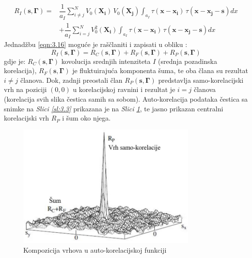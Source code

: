 \begin{equation}
	\begin{split}
		R_{I}(\boldsymbol{s}, \boldsymbol{\Gamma}) = &\dfrac{1}{a_{I}}\sum_{i\neq j}^{N}V_{0}(\boldsymbol{X_{i}})\, V_{0}(\boldsymbol{X_{j}})\int_{a_{I}}\tau (\boldsymbol{x}-\boldsymbol{x_{i}})\, \tau (\boldsymbol{x}-\boldsymbol{x_{j}}-\boldsymbol{s})dx\\
		 &+ \dfrac{1}{a_{I}}\sum_{i=j}^{N}V_{0}^{2}(\boldsymbol{X_{i}})\int_{a_{I}}\tau (\boldsymbol{x}-\boldsymbol{x_{i}})\, \tau (\boldsymbol{x}-\boldsymbol{x_{j}}-\boldsymbol{s})dx
	\end{split}
	\label{eqn:3.16}
\end{equation}
Jednadžbu \ref{eqn:3.16} moguće je raščlaniti i zapisati u obliku \cite{raffel2018_book}:
\begin{equation}
	R_{I}(\boldsymbol{s},\boldsymbol{\Gamma})=R_{C}(\boldsymbol{s},\boldsymbol{\Gamma})+R_{F}(\boldsymbol{s},\boldsymbol{\Gamma})+R_{P}(\boldsymbol{s},\boldsymbol{\Gamma})
	\label{eqn:3.17}
\end{equation}
gdje je: $R_{C}(\boldsymbol{s},\boldsymbol{\Gamma})$ kovolucija srednjih intenziteta $I$ (srednja pozadinska korelacija), $R_{F}(\boldsymbol{s},\boldsymbol{\Gamma})$ je fluktuirajuća komponenta šuma, te oba člana su rezultat $i\neq j$ članova. Dok, zadnji preostali član $R_{P}(\boldsymbol{s},\boldsymbol{\Gamma})$ predstavlja samo-korelacijski vrh na poziciji $(0, 0)$ u korelacijskoj ravnini i rezultat je $i=j$ članova (korelacija svih slika čestica samih sa sobom). Auto-korelacija podataka čestica sa snimke na \textit{Slici \ref{sl:3.3}} prikazana je na \textit{Slici \ref{sl:3.4}}, te jasno prikazan centralni korelacijski vrh $R_{P}$ i šum oko njega.
\begin{figure}[h]  
	\centering
	\includegraphics[width=9cm]{./3_MatPozadina/3_4AutoKorelacija.jpg} 
	\caption{Kompozicija vrhova u auto-korelacijskoj funkciji \cite{raffel2018_book}}
	\label{sl:3.4}
\end{figure}
